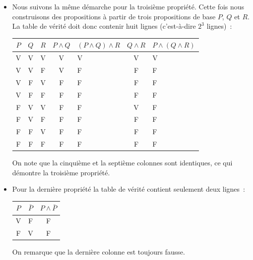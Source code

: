 \documentclass[10pt,notheorems]{beamer}
\theoremstyle{plain}
\theoremstyle{definition} %
\begin{document}
\begin{notes}
\begin{itemize}
    \item Nous suivons la même démarche pour la troisième
      propriété. Cette fois nous construisons des propositions à
      partir de trois propositions de base $P$, $Q$ et $R$. La table
      de vérité doit donc contenir huit lignes (c'est-à-dire $2^3$ lignes)~:
      \begin{table}[H]
        \centering
        \begin{tabular}[H]{|ccc|cgcg|}
          \hline
          $P$ & $Q$ & $R$ & $P\land Q$ & $(P\land Q)\land R$ & $Q\land R$ & $P \land (Q \land R)$ \\ \hline
          V & V & V & V & V & V & V\\
          V & V & F & V & F & F & F\\
          V & F & V & F & F & F & F\\
          V & F & F & F & F & F & F\\
          F & V & V & F & F & V & F\\
          F & V & F & F & F & F & F\\
          F & F & V & F & F & F & F\\
          F & F & F & F & F & F & F\\
          \hline\hline
        \end{tabular}
      \end{table}
      On note que la cinquième et la septième colonnes sont identiques, ce qui démontre la troisième propriété.

    \item Pour la dernière propriété la table de vérité contient seulement deux lignes~:
      \begin{table}
        \centering
        \begin{tabular}[H]{|c|cc|}
          \hline
          $P$ & $\bar P$ & $P \land \bar P$\\ \hline
          V & F & F\\
          F & V & F\\
          \hline\hline
        \end{tabular}
      \end{table}
      On remarque que la dernière colonne est toujours fausse.

    \end{itemize}

  \end{notes}
\end{document}
